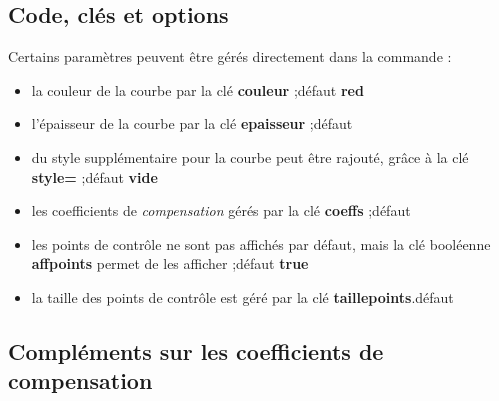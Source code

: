 \documentclass{article}
\newcommand\ctex[1]{\tcbox[vignettelatex]{#1}}
\newcommand\Cle[1]{{\bfseries\sffamily\textlangle #1\textrangle}}
\begin{document}
\subsection{Code, clés et options}

\begin{codetex}
\end{codetex}

\smallskip

\begin{codecles}
Certains paramètres peuvent être gérés directement dans la commande \ctex{\textbackslash splinetikz} :
%
\begin{itemize}
	\item la couleur de la courbe par la \textsf{clé} \Cle{couleur} ;\hfill{}défaut \Cle{red}
	\item l'épaisseur de la courbe par la \textsf{clé} \Cle{epaisseur} ;\hfill{}défaut \Cle{1.25pt}
	\item du style supplémentaire pour la courbe peut être rajouté, grâce à la \textsf{clé} \Cle{style=} ;\hfill{}défaut \Cle{vide}
	\item les coefficients de \textit{compensation} gérés par la \textsf{clé} \Cle{coeffs} ;\hfill{}défaut \Cle{3}
	\item les points de contrôle ne sont pas affichés par défaut, mais la \textsf{clé booléenne} \Cle{affpoints} permet de les afficher ;\hfill{}défaut \Cle{true}
	\item la taille des points de contrôle est géré par la \textsf{clé} \Cle{taillepoints}.\hfill{}défaut \Cle{2pt}
\end{itemize}
\end{codecles}

\subsection{Compléments sur les coefficients de \og compensation \fg}
\end{document}
